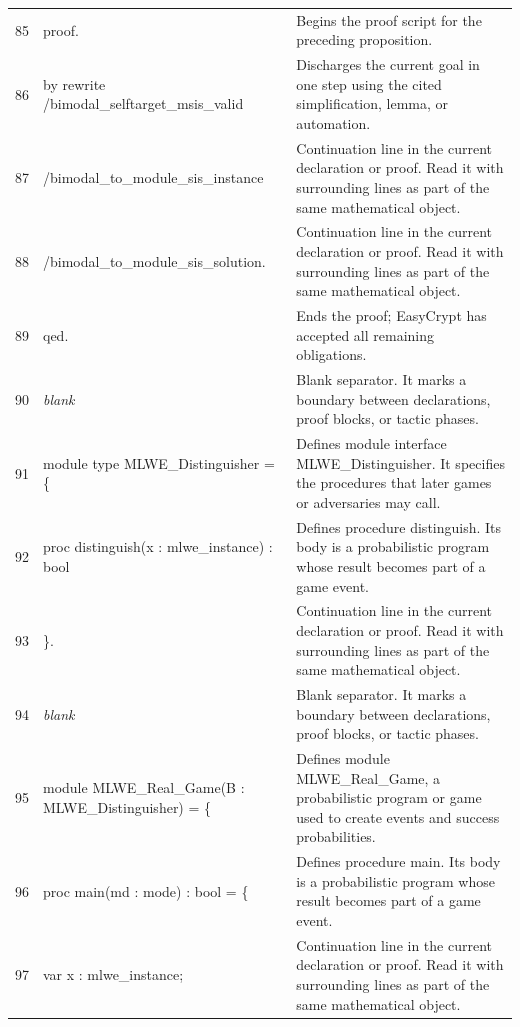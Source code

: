 \documentclass[10pt]{article}
\begin{document}
\begin{longtable}{r L{0.53\textwidth} L{0.37\textwidth}}
85 & {\ttfamily\scriptsize proof.} & Begins the proof script for the preceding proposition. \\
86 & {\ttfamily\scriptsize by rewrite /bimodal\_selftarget\_msis\_valid} & Discharges the current goal in one step using the cited simplification, lemma, or automation. \\
87 & {\ttfamily\scriptsize            /bimodal\_to\_module\_sis\_instance} & Continuation line in the current declaration or proof.  Read it with surrounding lines as part of the same mathematical object. \\
88 & {\ttfamily\scriptsize            /bimodal\_to\_module\_sis\_solution.} & Continuation line in the current declaration or proof.  Read it with surrounding lines as part of the same mathematical object. \\
89 & {\ttfamily\scriptsize qed.} & Ends the proof; EasyCrypt has accepted all remaining obligations. \\
90 & {\ttfamily\scriptsize \emph{blank}} & Blank separator.  It marks a boundary between declarations, proof blocks, or tactic phases. \\
91 & {\ttfamily\scriptsize module type MLWE\_Distinguisher = \{} & Defines module interface MLWE\_Distinguisher.  It specifies the procedures that later games or adversaries may call. \\
92 & {\ttfamily\scriptsize   proc distinguish(x : mlwe\_instance) : bool} & Defines procedure distinguish.  Its body is a probabilistic program whose result becomes part of a game event. \\
93 & {\ttfamily\scriptsize \}.} & Continuation line in the current declaration or proof.  Read it with surrounding lines as part of the same mathematical object. \\
94 & {\ttfamily\scriptsize \emph{blank}} & Blank separator.  It marks a boundary between declarations, proof blocks, or tactic phases. \\
95 & {\ttfamily\scriptsize module MLWE\_Real\_Game(B : MLWE\_Distinguisher) = \{} & Defines module MLWE\_Real\_Game, a probabilistic program or game used to create events and success probabilities. \\
96 & {\ttfamily\scriptsize   proc main(md : mode) : bool = \{} & Defines procedure main.  Its body is a probabilistic program whose result becomes part of a game event. \\
97 & {\ttfamily\scriptsize     var x : mlwe\_instance;} & Continuation line in the current declaration or proof.  Read it with surrounding lines as part of the same mathematical object. \\

\end{longtable}
\end{document}
